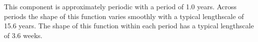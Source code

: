 This component is approximately periodic with a period of 1.0 years.
Across periods the shape of this function varies smoothly with a typical lengthscale of 15.6 years.
The shape of this function within each period has a typical lengthscale of 3.6 weeks.